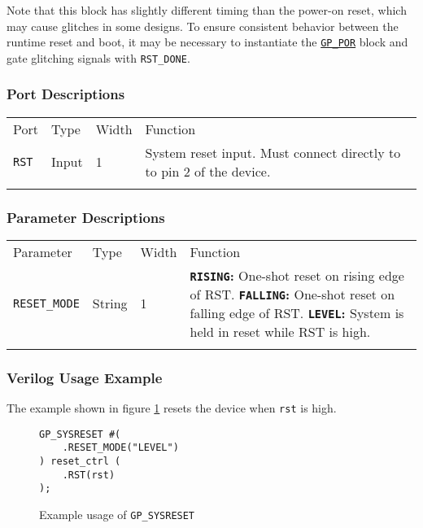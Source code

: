 \documentclass[11pt]{article}
\newcommand{\tokenstyle}[1]{\texttt{#1}}
\newcommand{\wirestyle}[1]{\texttt{#1}}
\newcommand{\valuestyle}[1]{\texttt{#1}}
\newcommand{\strvaluestyle}[1]{\valuestyle{\textquotedbl#1\textquotedbl}}
\newcommand{\strexamplestyle}[1]{\textbf{\strvaluestyle{#1}:}}
\newcommand{\whenstyle}[1]{{\fontseries{sb}\selectfont#1}}
\newcommand{\tokenref}[2]{\hyperref[#2]{\tokenstyle{#1}}}
\newcommand{\thinhline}{\Xhline{1\arrayrulewidth}}
\newcommand{\thickhline}{\Xhline{2.5\arrayrulewidth}}
\begin{document}
Note that this block has slightly different timing than the power-on reset, which may cause glitches in some designs.
To ensure consistent behavior between the runtime reset and boot, it may be necessary to instantiate the \tokenref{GP\_POR}{gp-por} block and gate glitching signals with \tokenstyle{RST\_DONE}.

\subsubsection{Port Descriptions}

\begin{tabularx}{\textwidth}{lllX}
\thinhline
\whenstyle{Port} & \whenstyle{Type} & \whenstyle{Width} & \whenstyle{Function} \\
\thickhline
\tokenstyle{RST} & Input & 1 & System reset input. Must connect directly to to pin 2 of the device.\\
\thinhline
\end{tabularx}

\subsubsection{Parameter Descriptions}

\begin{tabularx}{\textwidth}{lllX}
\thinhline
\whenstyle{Parameter} & \whenstyle{Type} & \whenstyle{Width} & \whenstyle{Function} \\
\thickhline
\tokenstyle{RESET\_MODE} & String & 1 &
	\strexamplestyle{RISING} One-shot reset on rising edge of RST. \newline
	\strexamplestyle{FALLING} One-shot reset on falling edge of RST. \newline
	\strexamplestyle{LEVEL} System is held in reset while RST is high.\\
\thinhline
\end{tabularx}

\subsubsection{Verilog Usage Example}

The example shown in figure \ref{gp-sysreset-example} resets the device when \wirestyle{rst} is high.

\begin{figure}[h]
\begin{lstlisting}
GP_SYSRESET #(
	.RESET_MODE("LEVEL")
) reset_ctrl (
	.RST(rst)
);
\end{lstlisting}
\caption{Example usage of \tokenstyle{GP\_SYSRESET}}
\label{gp-sysreset-example}
\end{figure}
\end{document}
